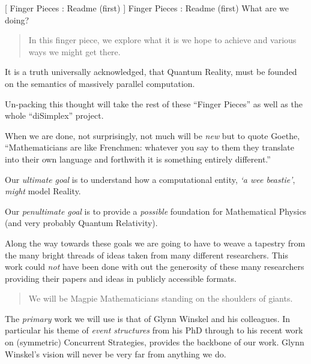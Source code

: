 
[
  Finger Pieces : Readme (first)
]{
  Finger Pieces : Readme (first) What are we doing?
}
\author{Stephen Gaito}

\maketitle

\begin{abstract}
  In this finger piece, we explore what it is we hope to achieve and various
  ways we might get there.
\end{abstract}


It is a truth universally acknowledged, that Quantum Reality, must be founded on
the semantics of massively parallel computation.

Un-packing this thought will take the rest of these ``Finger Pieces'' as well as
the whole ``diSimplex'' project.

When we are done, not surprisingly, not much will be \emph{new} but to quote
Goethe, ``Mathematicians are like Frenchmen: whatever you say to them they
translate into their own language and forthwith it is something entirely
different.''

Our \emph{ultimate goal} is to understand how a computational entity, \emph{`a
wee beastie'}, \emph{might} model Reality.

Our \emph{penultimate goal} is to provide a \emph{possible} foundation for
Mathematical Physics (and very probably Quantum Relativity).

Along the way towards these goals we are going to have to weave a tapestry from
the many bright threads of ideas taken from many different researchers. This
work could \emph{not} have been done with out the generosity of these many
researchers providing their papers and ideas in publicly accessible formats.

\begin{quote}
  We will be Magpie Mathematicians standing on the shoulders of
  giants.
\end{quote}

The \emph{primary} work we will use is that of Glynn Winskel and his colleagues.
In particular his theme of \emph{event structures} from his PhD through to his
recent work on (symmetric) Concurrent Strategies, provides the backbone of our
work. Glynn Winskel's vision will never be very far from anything we do.


